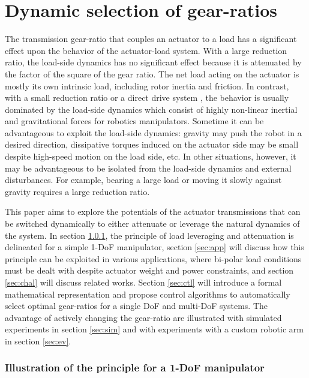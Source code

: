 \chapter{Dynamic selection of gear-ratios}  %
\label{sec:ControlAndPlanningOfRobotUsingVariableGearRatioActuators}

The transmission gear-ratio that couples an actuator to a load has a significant effect upon the behavior of the actuator-load system. With a large reduction ratio, the load-side dynamics has no significant effect because it is attenuated by the factor of the square of the gear ratio. The net load acting on the actuator is mostly its own intrinsic load, including rotor inertia and friction. In contrast, with a small reduction ratio or a direct drive system \cite{asada_direct-drive_1987}, the behavior is usually dominated by the load-side dynamics which consist of highly non-linear inertial and gravitational forces for robotics manipulators. Sometime it can be advantageous to exploit the load-side dynamics: gravity may push the robot in a desired direction, dissipative torques induced on the actuator side may be small despite high-speed motion on the load side, etc. In other situations, however, it may be advantageous to be isolated from the load-side dynamics and external disturbances. For example, bearing a large load or moving it slowly against gravity requires a large reduction ratio.

This paper aims to explore the potentials of the actuator transmissions that can be switched dynamically to either attenuate or leverage the natural dynamics of the system. In section \ref{sec:princ}, the principle of load leveraging and attenuation is delineated for a simple 1-DoF manipulator, section \ref{sec:app} will discuss how this principle can be exploited in various applications, where bi-polar load conditions must be dealt with despite actuator weight and power constraints, and section \ref{sec:chal} will discuss related works. Section \ref{sec:ctl} will introduce a formal mathematical representation and propose control algorithms to automatically select optimal gear-ratios for a single DoF and multi-DoF systems. The advantage of actively changing the gear-ratio are illustrated with simulated experiments in section \ref{sec:sim} and with experiments with a custom robotic arm in section \ref{sec:ev}.

\subsection{Illustration of the principle for a 1-DoF manipulator}
\label{sec:princ}

